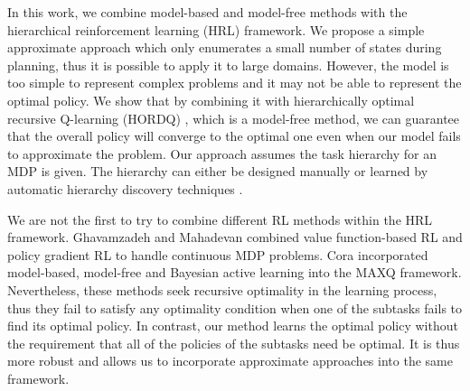 In this work, we combine model-based and model-free methods with the hierarchical 
reinforcement learning (HRL) framework. We propose a simple approximate approach which 
only enumerates a small number of states during planning, thus it is possible to apply it to large 
domains. 
However, the model is too simple to represent complex problems and it may not be able to represent the 
optimal policy. We show that by combining it with 
hierarchically optimal recursive Q-learning (HORDQ) \cite{HORDQ}, which is a model-free method, we can 
guarantee that the overall policy will converge to the optimal one even when our model
fails to approximate the problem. Our approach assumes the task hierarchy for an MDP is given. The hierarchy can either be 
designed manually or learned by automatic hierarchy discovery techniques \cite{HexQ}.



We are not the first to try to combine different RL methods within the HRL framework.  
Ghavamzadeh and Mahadevan \cite{HybridPolicy} combined value function-based RL and policy gradient RL to handle
continuous MDP problems. Cora \cite{Vlad} incorporated model-based, model-free and Bayesian active learning into the MAXQ framework.
Nevertheless, these methods seek recursive optimality in the learning process, 
thus they fail to satisfy any optimality condition when one of the subtasks
fails to find its optimal policy.
In contrast, our method learns the optimal policy without the requirement that 
all of the policies of the subtasks need be optimal. It is thus more robust and allows us to incorporate approximate
approaches into the same framework.






